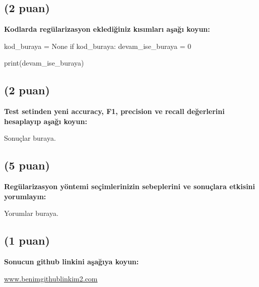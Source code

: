 \documentclass[11pt]{article}
\begin{document}
\subsection{(2 puan)} \textbf{Kodlarda regülarizasyon eklediğiniz kısımları aşağı koyun:} 

\begin{python}
kod_buraya = None
if kod_buraya:
    devam_ise_buraya = 0

print(devam_ise_buraya)
\end{python}

\subsection{(2 puan)} \textbf{Test setinden yeni accuracy, F1, precision ve recall değerlerini hesaplayıp aşağı koyun:}

Sonuçlar buraya.

\subsection{(5 puan)} \textbf{Regülarizasyon yöntemi seçimlerinizin sebeplerini ve sonuçlara etkisini yorumlayın:}

Yorumlar buraya.

\subsection{(1 puan)} \textbf{Sonucun github linkini  aşağıya koyun:}

\url{www.benimgithublinkim2.com}
\end{document}
